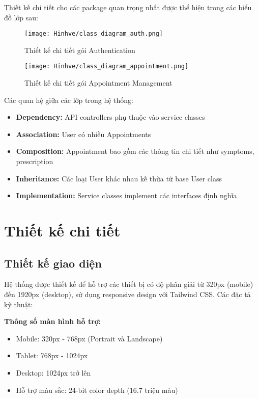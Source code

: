 \documentclass[../DoAn.tex]{subfiles}
\begin{document}
Thiết kế chi tiết cho các package quan trọng nhất được thể hiện trong các biểu đồ lớp sau:

\begin{figure}[H]
    \centering
    \texttt{[image: Hinhve/class\_diagram\_auth.png]}
    \caption{Thiết kế chi tiết gói Authentication}
    \label{fig:auth_package}
\end{figure}

\begin{figure}[H]
    \centering
    \texttt{[image: Hinhve/class\_diagram\_appointment.png]}
    \caption{Thiết kế chi tiết gói Appointment Management}
    \label{fig:appointment_package}
\end{figure}

Các quan hệ giữa các lớp trong hệ thống:
\begin{itemize}
    \item \textbf{Dependency:} API controllers phụ thuộc vào service classes
    \item \textbf{Association:} User có nhiều Appointments
    \item \textbf{Composition:} Appointment bao gồm các thông tin chi tiết như symptoms, prescription
    \item \textbf{Inheritance:} Các loại User khác nhau kế thừa từ base User class
    \item \textbf{Implementation:} Service classes implement các interfaces định nghĩa
\end{itemize}

\section{Thiết kế chi tiết}
\subsection{Thiết kế giao diện}

Hệ thống được thiết kế để hỗ trợ các thiết bị có độ phân giải từ 320px (mobile) đến 1920px (desktop), sử dụng responsive design với Tailwind CSS. Các đặc tả kỹ thuật:

\textbf{Thông số màn hình hỗ trợ:}
\begin{itemize}
    \item Mobile: 320px - 768px (Portrait và Landscape)
    \item Tablet: 768px - 1024px
    \item Desktop: 1024px trở lên
    \item Hỗ trợ màu sắc: 24-bit color depth (16.7 triệu màu)
\end{itemize}
\end{document}

